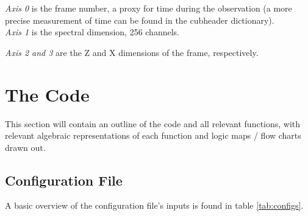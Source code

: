 \documentclass[12pt]{article}
\begin{document}
{\it Axis 0} is the frame number, a proxy for time during the observation (a more
precise measurement of time can be found in the cubheader dictionary).\\

{\it Axis 1} is the spectral dimension, 256 channels.

{\it Axis 2 and 3} are the Z and X dimensions of the frame, respectively.

\section{The Code}

This section will contain an outline of the code and all relevant functions,
with relevant algebraic representations of each function and logic maps / flow
charts drawn out.

\subsection{Configuration File}

A basic overview of the configuration file's inputs is found in table
\ref{tab:configs}.\\
\end{document}
